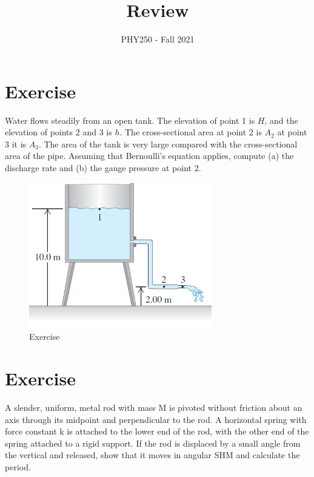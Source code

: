 \documentclass[12pt]{article}
\title{Review}
\author{PHY250 - Fall 2021}
\date{}
\begin{document}
\maketitle






\setcounter{example}{1}

\section*{Exercise \theexample}
Water flows steadily from an open tank. The elevation of point 1 is $H$, and the elevation
of points 2 and 3 is $h$. The cross-sectional area at point 2 is $A_2$
at point 3 it is $A_3$. The area of the tank is very
large compared with the cross-sectional area of the pipe. Assuming
that Bernoulli’s equation applies, compute (a) the discharge
rate  and (b) the gauge pressure at point 2.

\vspace{5mm}

\begin{figure}[h!]
    \begin{center}
      \includegraphics[height=2.5in]{images/1.jpg}
      \caption{Exercise \theexample }
      \label{1}
    \end{center}
  \end{figure}


\section*{Exercise \theexample}

A slender, uniform,
metal rod with mass M
is pivoted without friction about
an axis through its midpoint and
perpendicular to the rod. A horizontal
spring with force constant
k is attached to the lower end of
the rod, with the other end of the
spring attached to a rigid support.
If the rod is displaced by a
small angle from the vertical
 and released, show
that it moves in angular SHM
and calculate the period. 
\end{document}
